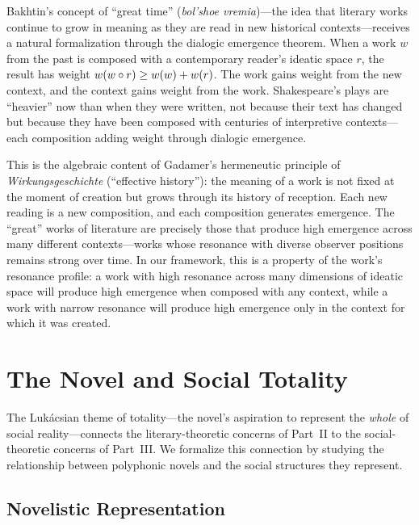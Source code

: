 \begin{remark}
\label{rem:great-time}
Bakhtin's concept of ``great time'' (\emph{bol'shoe vremia})---the idea that literary works continue to grow in meaning as they are read in new historical contexts---receives a natural formalization through the dialogic emergence theorem.  When a work $w$ from the past is composed with a contemporary reader's ideatic space $r$, the result has weight $w(w \circ r) \geq w(w) + w(r)$.  The work gains weight from the new context, and the context gains weight from the work.  Shakespeare's plays are ``heavier'' now than when they were written, not because their text has changed but because they have been composed with centuries of interpretive contexts---each composition adding weight through dialogic emergence.

This is the algebraic content of Gadamer's hermeneutic principle of \emph{Wirkungsgeschichte} (``effective history''): the meaning of a work is not fixed at the moment of creation but grows through its history of reception.  Each new reading is a new composition, and each composition generates emergence.  The ``great'' works of literature are precisely those that produce high emergence across many different contexts---works whose resonance with diverse observer positions remains strong over time.  In our framework, this is a property of the work's resonance profile: a work with high resonance across many dimensions of ideatic space will produce high emergence when composed with any context, while a work with narrow resonance will produce high emergence only in the context for which it was created.
\end{remark}


\section{The Novel and Social Totality}

The Luk\'acsian theme of totality---the novel's aspiration to represent the
\emph{whole} of social reality---connects the literary-theoretic concerns of
Part~II to the social-theoretic concerns of Part~III.  We formalize this
connection by studying the relationship between polyphonic novels and the
social structures they represent.

\subsection{Novelistic Representation}

